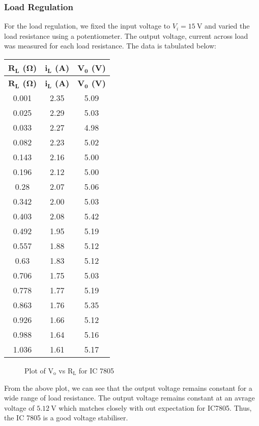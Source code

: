 \documentclass{scrartcl}
\begin{document}
\subsubsection{Load Regulation}
For the load regulation, we fixed the input voltage to $V_i = 15 \ \mathrm{V}$ and varied the load resistance using a potentiometer. The output voltage, current across load was measured for each load resistance. The data is tabulated below:
\begin{longtable}{|c|c|c|}
        \hline
        \textbf{$\mathbf{R_L}$ ($\mathbf{\Omega}$)} & \textbf{$\mathbf{i_L}$ (A)} & \textbf{$\mathbf{V_0}$ (V)} \\ \hline
        \endfirsthead
        
        \hline
        \textbf{$\mathbf{R_L}$ ($\mathbf{\Omega}$)} & \textbf{$\mathbf{i_L}$ (A)} & \textbf{$\mathbf{V_0}$ (V)} \\ \hline
        \endhead
        
        \hline
        \endfoot
        
        \hline
        \endlastfoot
        
        0.001      & 2.35      & 5.09 \\ \hline
        0.025      & 2.29      & 5.03 \\ \hline
        0.033      & 2.27      & 4.98 \\ \hline
        0.082      & 2.23      & 5.02 \\ \hline
        0.143      & 2.16      & 5.00 \\ \hline
        0.196      & 2.12      & 5.00 \\ \hline
        0.28       & 2.07      & 5.06 \\ \hline
        0.342      & 2.00      & 5.03 \\ \hline
        0.403      & 2.08      & 5.42 \\ \hline
        0.492      & 1.95      & 5.19 \\ \hline
        0.557      & 1.88      & 5.12 \\ \hline
        0.63       & 1.83      & 5.12 \\ \hline
        0.706      & 1.75      & 5.03 \\ \hline
        0.778      & 1.77      & 5.19 \\ \hline
        0.863      & 1.76      & 5.35 \\ \hline
        0.926      & 1.66      & 5.12 \\ \hline
        0.988      & 1.64      & 5.16 \\ \hline
        1.036      & 1.61      & 5.17 \\ \hline
        \end{longtable}
        \noindent
\begin{figure}[H]
        \centering
        
        \caption{Plot of $\mathrm{V_o}$ vs $\mathrm{R_L}$ for IC 7805}
\end{figure}
\noindent
From the above plot, we can see that the output voltage remains constant for a wide range of load resistance. The output voltage remains constant at an avrage voltage of $5.12 \ \mathrm{V}$ which matches closely with out expectation for IC7805. Thus, the IC 7805 is a good voltage stabiliser.
\end{document}
